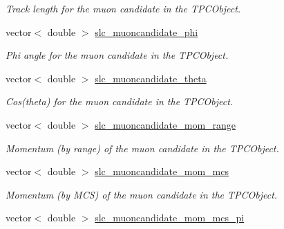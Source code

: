 \begin{DoxyCompactItemize}
\begin{DoxyCompactList}\small\item\em Track length for the muon candidate in the T\-P\-C\-Object. \end{DoxyCompactList}\item 
\hypertarget{classUBXSecEvent_a99414e0a0e74aaeac78fa019f53f4760}{vector$<$ double $>$ \hyperlink{classUBXSecEvent_a99414e0a0e74aaeac78fa019f53f4760}{slc\-\_\-muoncandidate\-\_\-phi}}\label{classUBXSecEvent_a99414e0a0e74aaeac78fa019f53f4760}

\begin{DoxyCompactList}\small\item\em Phi angle for the muon candidate in the T\-P\-C\-Object. \end{DoxyCompactList}\item 
\hypertarget{classUBXSecEvent_a8b3d8a8475d7c283fad2d1d4e6a85dca}{vector$<$ double $>$ \hyperlink{classUBXSecEvent_a8b3d8a8475d7c283fad2d1d4e6a85dca}{slc\-\_\-muoncandidate\-\_\-theta}}\label{classUBXSecEvent_a8b3d8a8475d7c283fad2d1d4e6a85dca}

\begin{DoxyCompactList}\small\item\em Cos(theta) for the muon candidate in the T\-P\-C\-Object. \end{DoxyCompactList}\item 
\hypertarget{classUBXSecEvent_a80cdc2f0c0eaac347f9475e1e04ca68b}{vector$<$ double $>$ \hyperlink{classUBXSecEvent_a80cdc2f0c0eaac347f9475e1e04ca68b}{slc\-\_\-muoncandidate\-\_\-mom\-\_\-range}}\label{classUBXSecEvent_a80cdc2f0c0eaac347f9475e1e04ca68b}

\begin{DoxyCompactList}\small\item\em Momentum (by range) of the muon candidate in the T\-P\-C\-Object. \end{DoxyCompactList}\item 
\hypertarget{classUBXSecEvent_abfd994bade285f9f67f74f1a210f5422}{vector$<$ double $>$ \hyperlink{classUBXSecEvent_abfd994bade285f9f67f74f1a210f5422}{slc\-\_\-muoncandidate\-\_\-mom\-\_\-mcs}}\label{classUBXSecEvent_abfd994bade285f9f67f74f1a210f5422}

\begin{DoxyCompactList}\small\item\em Momentum (by M\-C\-S) of the muon candidate in the T\-P\-C\-Object. \end{DoxyCompactList}\item 
\hypertarget{classUBXSecEvent_a28a09d3ac5399de319c2fb2d31ea0652}{vector$<$ double $>$ \hyperlink{classUBXSecEvent_a28a09d3ac5399de319c2fb2d31ea0652}{slc\-\_\-muoncandidate\-\_\-mom\-\_\-mcs\-\_\-pi}}\label{classUBXSecEvent_a28a09d3ac5399de319c2fb2d31ea0652}


\end{DoxyCompactItemize}
